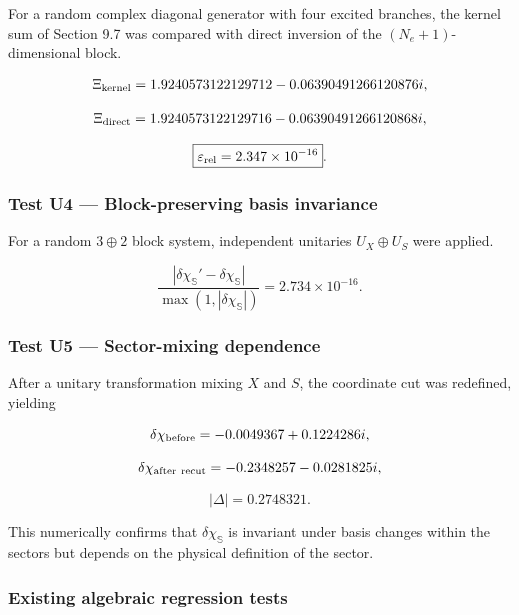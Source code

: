 \documentclass[
  10pt,
  a4paper,
]{article}
\begin{document}
For a random complex diagonal generator with four excited branches, the
kernel sum of Section 9.7 was compared with direct inversion of the
\((N_e+1)\)-dimensional block.

\[
\Xi_{\rm kernel}
=1.9240573122129712-0.06390491266120876i,
\]

\[
\Xi_{\rm direct}
=1.9240573122129716-0.06390491266120868i,
\]

\[
\boxed{
\varepsilon_{\rm rel}=2.347\times10^{-16}
}.
\]

\subsubsection{Test U4 --- Block-preserving basis
invariance}\label{test-u4-block-preserving-basis-invariance}

For a random \(3\oplus2\) block system, independent unitaries
\(U_X\oplus U_S\) were applied.

\[
\boxed{
\frac{|\delta\chi_{\mathbb S}'-\delta\chi_{\mathbb S}|}
{\max(1,|\delta\chi_{\mathbb S}|)}
=2.734\times10^{-16}
}.
\]

\subsubsection{Test U5 --- Sector-mixing
dependence}\label{test-u5-sector-mixing-dependence}

After a unitary transformation mixing \(X\) and \(S\), the coordinate
cut was redefined, yielding

\[
\delta\chi_{\rm before}
=-0.0049367+0.1224286i,
\]

\[
\delta\chi_{\rm after\ recut}
=-0.2348257-0.0281825i,
\]

\[
|\Delta|=0.2748321.
\]

This numerically confirms that \(\delta\chi_{\mathbb S}\) is invariant
under basis changes within the sectors but depends on the physical
definition of the sector.

\subsubsection{Existing algebraic regression
tests}\label{existing-algebraic-regression-tests}
\end{document}
